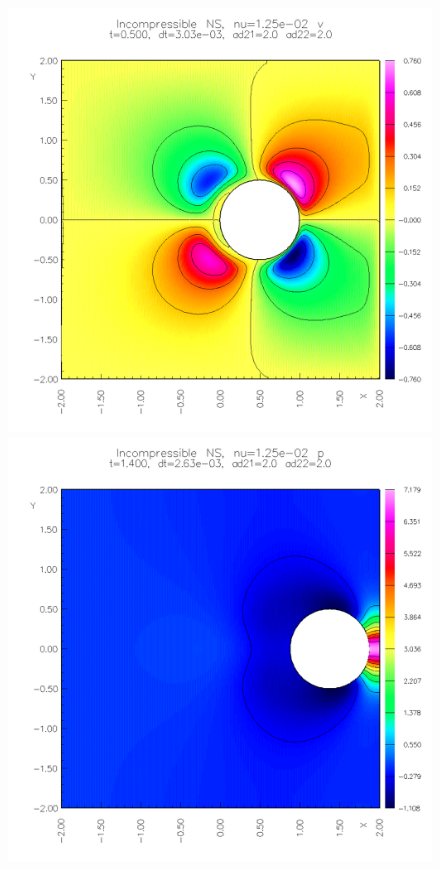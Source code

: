 {\begin{figure}
\begin{center}
\includegraphics[width=\figWidth]{figures/collide5-v-0p5}  
%
\includegraphics[width=\figWidth]{figures/collide5-p-1p4}  

\end{center}
\end{figure}}
